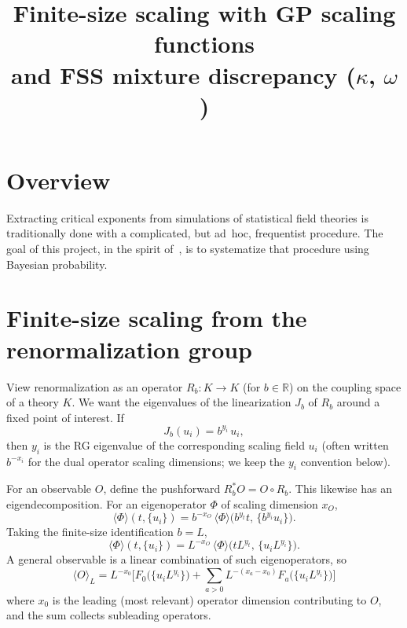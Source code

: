 \documentclass[11pt]{article}
\title{Finite-size scaling with GP scaling functions\\
and FSS mixture discrepancy ($\kappa$, $\omega$)}
\author{}
\date{}
\begin{document}
\maketitle

\section{Overview}

Extracting critical exponents from simulations of statistical field
theories is traditionally done with a complicated, but ad~hoc,
frequentist procedure.
The goal of this project, in the spirit of~\cite{harada}, is to
systematize that procedure using Bayesian probability.

\section{Finite-size scaling from the renormalization group}

View renormalization as an operator $R_b : K \to K$ (for $b\in\mathbb{R}$)
on the coupling space of a theory $K$.
We want the eigenvalues of the linearization $J_b$ of $R_b$ around a
fixed point of interest.
If
\begin{equation}
  J_b(u_i) = b^{y_i}\, u_i,
\end{equation}
then $y_i$ is the RG eigenvalue of the corresponding scaling field $u_i$
(often written $b^{-x_i}$ for the dual operator scaling dimensions; we
keep the $y_i$ convention below).

For an observable $O$, define the pushforward
$R_b^* O = O\circ R_b$.
This likewise has an eigendecomposition.
For an eigenoperator $\Phi$ of scaling dimension $x_O$,
\begin{equation}
  \langle\Phi\rangle(t,\{u_i\})
    = b^{-x_O}\,
      \langle\Phi\rangle\!\bigl(b^{y_t} t,\, \{b^{y_i} u_i\}\bigr).
\end{equation}
Taking the finite-size identification $b = L$,
\begin{equation}
  \label{eq:fss-eigen}
  \langle\Phi\rangle(t,\{u_i\})
    = L^{-x_O}\,
      \langle\Phi\rangle\!\bigl(t L^{y_t},\, \{u_i L^{y_i}\}\bigr).
\end{equation}
A general observable is a linear combination of such eigenoperators, so
\begin{equation}
  \label{eq:fss-general}
  \boxed{
  \langle O\rangle_L
    = L^{-x_0}
      \Biggl[
        F_0\bigl(\{u_i L^{y_i}\}\bigr)
        +
        \sum_{a>0}
        L^{-(x_a-x_0)}
        F_a\bigl(\{u_i L^{y_i}\}\bigr)
      \Biggr]
  }
\end{equation}
where $x_0$ is the leading (most relevant) operator dimension contributing
to $O$, and the sum collects subleading operators.
\end{document}
